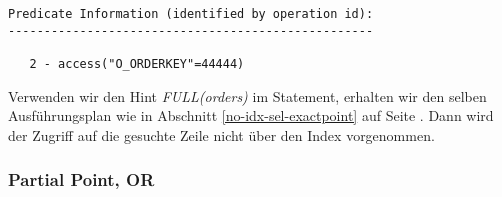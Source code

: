 \documentclass[11pt,a4paper,parskip=half]{scrartcl}
\begin{document}
\begin{lstlisting}
Predicate Information (identified by operation id):                                                                                                                                                                                                                                                          
---------------------------------------------------                                                                                                                                                                                                                                                          
                                                                                                                                                                                                                                                                                                             
   2 - access("O_ORDERKEY"=44444)    
\end{lstlisting}

Verwenden wir den Hint \emph{FULL(orders)} im Statement, erhalten wir den selben Ausführungsplan wie in Abschnitt \ref{no-idx-sel-exactpoint} auf Seite \pageref{no-idx-sel-exactpoint}. Dann wird der Zugriff auf die gesuchte Zeile nicht über den Index vorgenommen.

\subsubsection{Partial Point, OR}
\end{document}
